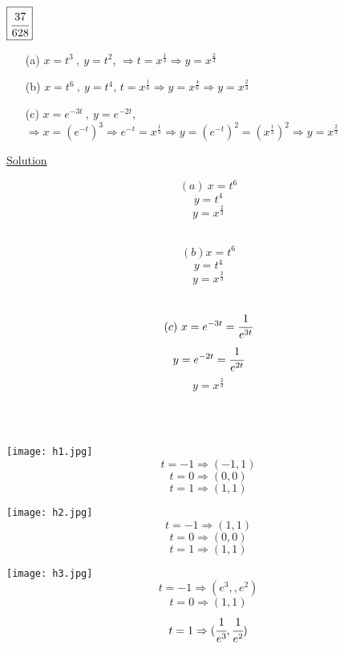 \begin{example}
$\boxed{\cfrac{37}{628}}$\begin{enumerate}
    \item[(a)] $x=t^3~,~y=t^2$, {\color{red}$\Rightarrow t=x^\frac{1}{3}\Rightarrow y=x^\frac{2}{3}$}
    \item[(b)] $x=t^{6}~,~y=t^{4}$, {\color{red}$t=x^{\frac{1}{6}}\Rightarrow y=x^\frac{4}{6}\Rightarrow y=x^\frac{2}{3}$}
    \item[(c)] $x=e^{-3t}~,~y=e^{-2t}$, {\color{red}$\Rightarrow x=(e^{-t})^3\Rightarrow e^{-t}=x^\frac{1}{3}\Rightarrow y=(e^{-t})^2=(x^\frac{1}{3})^2\Rightarrow y=x^\frac{2}{3}$}
    \end{enumerate}
    \underline{\textbf{\large}\color{smalt(darkpowderblue)}Solution} \\
    \begin{minipage}{0.1\textwidth}
$$(a) ~ x=t^6$$
$$y=t^4$$
$$y=x^\frac{2}{3}$$\\
\end{minipage} 
\begin{minipage}{0.62\textwidth}
$$(b)  x=t^6$$
$$y=t^4$$
$$y=x^\frac{2}{3}$$\\
\end{minipage} 
\begin{minipage}{0.18\textwidth}
$$(c)~x=e^{-3t}=\cfrac{1}{e^{3t}}$$
$$y=e^{-2t}=\cfrac{1}{e^{2t}}$$
$$y=x^\frac{2}{3}$$\\
\end{minipage}\\ 
\noindent\begin{minipage}{0.3\textwidth}
\texttt{[image: h1.jpg]}
$$t=-1 \Rightarrow (-1,1) $$
$$t=0 \Rightarrow (0,0)$$
$$t=1 \Rightarrow (1,1)$$
\end{minipage}
\noindent\begin{minipage}{0.4\textwidth}
\texttt{[image: h2.jpg]}
$$t=-1 \Rightarrow (1,1) $$
$$t=0 \Rightarrow (0,0)$$
$$t=1 \Rightarrow (1,1)$$
\end{minipage}
\noindent\begin{minipage}{0.3\textwidth}
\texttt{[image: h3.jpg]}
$$t=-1 \Rightarrow (e^3,,e^2) $$
$$t=0 \Rightarrow (1,1)$$
$$t=1 \Rightarrow (\cfrac{1}{e^3},\cfrac{1}{e^2})$$
\end{minipage}
\end{example}